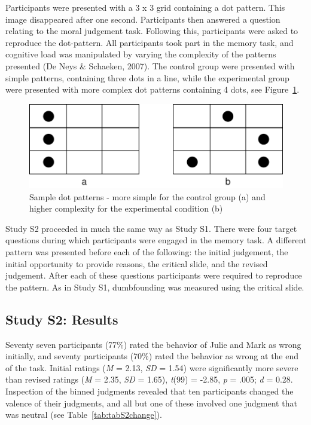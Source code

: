 \documentclass[
  man,floatsintext]{apa6}
\begin{document}
Participants were presented with a 3 x 3 grid containing a dot pattern. This image disappeared after one second. Participants then answered a question relating to the moral judgement task. Following this, participants were asked to reproduce the dot-pattern. All participants took part in the memory task, and cognitive load was manipulated by varying the complexity of the patterns presented (De Neys \& Schaeken, 2007). The control group were presented with simple patterns, containing three dots in a line, while the experimental group were presented with more complex dot patterns containing 4 dots, see Figure~\ref{fig:S2dotpattern}.

\begin{figure}[!h]
\includegraphics{Supplementary_files/figure-latex/S2dotpattern-1} \caption{Sample dot patterns - more simple for the control group (a) and higher complexity for the experimental condition (b)}\label{fig:S2dotpattern}
\end{figure}

Study S2 proceeded in much the same way as Study S1. There were four target questions during which participants were engaged in the memory task. A different pattern was presented before each of the following: the initial judgement, the initial opportunity to provide reasons, the critical slide, and the revised judgement. After each of these questions participants were required to reproduce the pattern. As in Study S1, dumbfounding was measured using the critical slide.

\hypertarget{study-s2-results}{%
\subsection{Study S2: Results}\label{study-s2-results}}

Seventy seven participants (77\%) rated the behavior of Julie and Mark as wrong initially, and seventy participants (70\%) rated the behavior as wrong at the end of the task. Initial ratings (\emph{M} = 2.13, \emph{SD} = 1.54) were significantly more severe than revised ratings (\emph{M} = 2.35, \emph{SD} = 1.65), \emph{t}(99) = -2.85, \emph{p} = .005; \emph{d} = 0.28. Inspection of the binned judgments revealed that ten participants changed the valence of their judgments, and all but one of these involved one judgment that was neutral (see Table~\ref{tab:tabS2change}).
\end{document}
